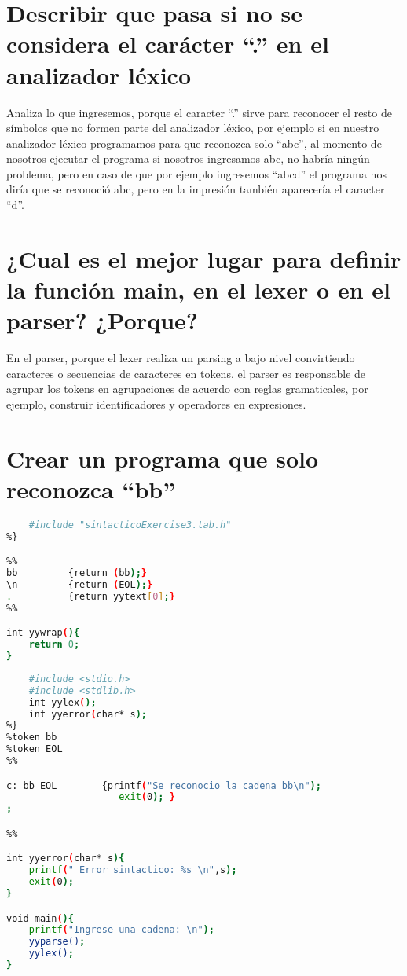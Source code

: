 \documentclass[12pt]{article}
\title{
\centerline{
    \texttt{[image: unsa.png]}}
    \vspace{0.5 cm}
        Teoría de la Computación - Laboratorio A
        \\
        \\
        \\
        \textbf{Práctica de Laboratorio #6} 
        \large  
        \\
        \small Universidad Nacional de San Agustín - Escuela Profesional de Ingeniería de Sistemas, Arequipa, Perú 
  }
\author{
    Carlos Alberto Mestas Escarcena
    \\
    \texttt{cmestas@unsa.edu.pe}
}
\date{23 de Junio del 2020}
\begin{document}
\maketitle

\section{Describir que pasa si no se considera el carácter “.” en el analizador léxico}

Analiza lo que ingresemos, porque el caracter “.” sirve para reconocer el resto de símbolos que no formen parte del analizador léxico, por ejemplo si en nuestro analizador léxico programamos para que reconozca solo “abc”, al momento de nosotros ejecutar el programa si nosotros ingresamos abc, no habría ningún problema, pero en caso de que por ejemplo ingresemos “abcd” el programa nos diría que se reconoció abc, pero en la impresión también aparecería el caracter “d”. 

\section{¿Cual es el mejor lugar para definir la función main, en el lexer o en el parser? ¿Porque?}

En el parser, porque el lexer realiza un parsing a bajo nivel convirtiendo caracteres o secuencias de caracteres en tokens, el parser es responsable de agrupar los tokens en agrupaciones de acuerdo con reglas gramaticales, por ejemplo, construir identificadores y operadores en expresiones.

\section{Crear un programa que solo reconozca “bb”}

\begin{lstlisting}[language=bash,frame=single,style=CStyle,caption={lexicoExercise3.l}]
%{
    #include "sintacticoExercise3.tab.h"
%}

%%
bb         {return (bb);}
\n         {return (EOL);}
.          {return yytext[0];}
%%

int yywrap(){
    return 0;
}
\end{lstlisting}

\begin{lstlisting}[language=bash,frame=single,style=CStyle,caption={sintacticoExercise3.y}]
%{
    #include <stdio.h>
    #include <stdlib.h>
    int yylex();
    int yyerror(char* s);
%}
%token bb
%token EOL
%%

c: bb EOL        {printf("Se reconocio la cadena bb\n");
                    exit(0); }
;

%%

int yyerror(char* s){
    printf(" Error sintactico: %s \n",s);
    exit(0);
}

void main(){
    printf("Ingrese una cadena: \n");
    yyparse();
    yylex();
}
\end{lstlisting}
\end{document}
